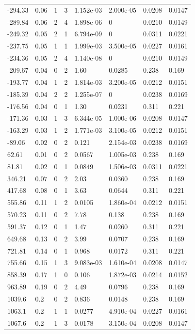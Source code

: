 \documentclass[preview]{standalone}
\begin{document}
{{\begin{tabular}{L{1.2cm}C{1.2cm} C{0.3cm}C{0.5cm} C{1.4cm}C{1.4cm} C{1.4cm}C{1.4cm}}
  -294.33  &  0.06  & 1     &  3 &  1.152e-03  & 2.000e-05  & 0.0208 &  0.0147   \\ 
  -289.84  &  0.06  & 2     &  4 &  1.898e-06  & 0  & 0.0210 &  0.0149   \\ 
  -249.32  &  0.05  & 2     &  1 &  6.794e-09  & 0  & 0.0311 &  0.0221   \\ 
  -237.75  &  0.05  & 1     &  1 &  1.999e-03  & 3.500e-05  & 0.0227 &  0.0161   \\ 
  -234.36  &  0.05  & 2     &  4 &  1.140e-08  & 0  & 0.0210 &  0.0149   \\ 
  -209.67  &  0.04  & 0     &  2 &  1.60  & 0.0285  & 0.238 &  0.169   \\ 
  -193.77  &  0.04  & 1     &  2 &  1.814e-03  & 3.200e-05  & 0.0212 &  0.0151   \\ 
  -185.39  &  0.04  & 2     &  2 &  1.255e-07  & 0  & 0.0238 &  0.0169   \\ 
  -176.56  &  0.04  & 0     &  1 &  1.30  & 0.0231  & 0.311 &  0.221   \\ 
  -171.36  &  0.03  & 1     &  3 &  6.344e-05  & 1.000e-06  & 0.0208 &  0.0147   \\ 
  -163.29  &  0.03  & 1     &  2 &  1.771e-03  & 3.100e-05  & 0.0212 &  0.0151   \\ 
  -89.06  &  0.02  & 0     &  2 &  0.121  & 2.154e-03  & 0.0238 &  0.0169   \\ 
  62.61  &  0.01  & 0     &  2 &  0.0567  & 1.005e-03  & 0.238 &  0.169   \\ 
  81.81  &  0.02  & 0     &  1 &  0.0849  & 1.506e-03  & 0.0311 &  0.0221   \\ 
  346.21  &  0.07  & 0     &  2 &  2.03  & 0.0360  & 0.238 &  0.169   \\ 
  417.68  &  0.08  & 0     &  1 &  3.63  & 0.0644  & 0.311 &  0.221   \\ 
  555.86  &  0.11  & 1     &  2 &  0.0105  & 1.860e-04  & 0.0212 &  0.0151   \\ 
  570.23  &  0.11  & 0     &  2 &  7.78  & 0.138  & 0.238 &  0.169   \\ 
  591.37  &  0.12  & 0     &  1 &  1.47  & 0.0260  & 0.311 &  0.221   \\ 
  649.68  &  0.13  & 0     &  2 &  3.99  & 0.0707  & 0.238 &  0.169   \\ 
  721.81  &  0.14  & 0     &  1 &  0.968  & 0.0172  & 0.311 &  0.221   \\ 
  755.66  &  0.15  & 1     &  3 &  9.083e-03  & 1.610e-04  & 0.0208 &  0.0147   \\ 
  858.39  &  0.17  & 1     &  0 &  0.106  & 1.872e-03  & 0.0214 &  0.0152   \\ 
  963.89  &  0.19  & 0     &  2 &  4.49  & 0.0796  & 0.238 &  0.169   \\ 
  1039.6  &   0.2  & 0     &  2 &  0.836  & 0.0148  & 0.238 &  0.169   \\ 
  1063.1  &   0.2  & 1     &  1 &  0.0277  & 4.910e-04  & 0.0227 &  0.0161   \\ 
  1067.6  &   0.2  & 1     &  3 &  0.0178  & 3.150e-04  & 0.0208 &  0.0147   \\ 
\hline 
\end{tabular} 

}}
\end{document}

